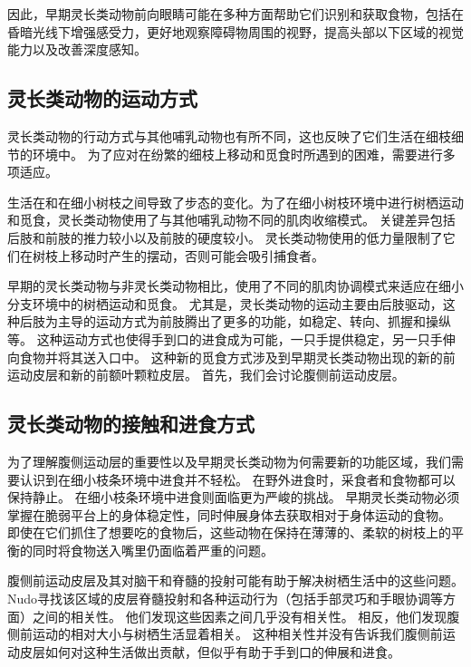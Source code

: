 因此，早期灵长类动物前向眼睛可能在多种方面帮助它们识别和获取食物，包括在昏暗光线下增强感受力，更好地观察障碍物周围的视野，提高头部以下区域的视觉能力以及改善深度感知。



\subsection{灵长类动物的运动方式}

灵长类动物的行动方式与其他哺乳动物也有所不同，这也反映了它们生活在细枝细节的环境中。
为了应对在纷繁的细枝上移动和觅食时所遇到的困难，需要进行多项适应。


生活在和在细小树枝之间导致了步态的变化。为了在细小树枝环境中进行树栖运动和觅食，灵长类动物使用了与其他哺乳动物不同的肌肉收缩模式\cite{larson1998unique}。
关键差异包括后肢和前肢的推力较小以及前肢的硬度较小\cite{schmitt2010primate}。
灵长类动物使用的低力量限制了它们在树枝上移动时产生的摆动，否则可能会吸引捕食者。


早期的灵长类动物与非灵长类动物相比，使用了不同的肌肉协调模式来适应在细小分支环境中的树栖运动和觅食。
尤其是，灵长类动物的运动主要由后肢驱动，这种后肢为主导的运动方式为前肢腾出了更多的功能，如稳定、转向、抓握和操纵等。
这种运动方式也使得手到口的进食成为可能，一只手提供稳定，另一只手伸向食物并将其送入口中。
这种新的觅食方式涉及到早期灵长类动物出现的新的前运动皮层和新的前额叶颗粒皮层。
首先，我们会讨论腹侧前运动皮层。



\subsection{灵长类动物的接触和进食方式}

为了理解腹侧运动层的重要性以及早期灵长类动物为何需要新的功能区域，我们需要认识到在细小枝条环境中进食并不轻松。
在野外进食时，采食者和食物都可以保持静止。
在细小枝条环境中进食则面临更为严峻的挑战。
早期灵长类动物必须掌握在脆弱平台上的身体稳定性，同时伸展身体去获取相对于身体运动的食物。
即使在它们抓住了想要吃的食物后，这些动物在保持在薄薄的、柔软的树枝上的平衡的同时将食物送入嘴里仍面临着严重的问题。


腹侧前运动皮层及其对脑干和脊髓的投射可能有助于解决树栖生活中的这些问题。
Nudo\cite{nudo1990descending}寻找该区域的皮层脊髓投射和各种运动行为（包括手部灵巧和手眼协调等方面）之间的相关性。
他们发现这些因素之间几乎没有相关性。
相反，他们发现腹侧前运动的相对大小与树栖生活显着相关。
这种相关性并没有告诉我们腹侧前运动皮层如何对这种生活做出贡献，但似乎有助于手到口的伸展和进食。



